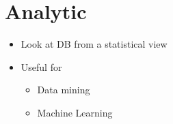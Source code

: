 
\section{Analytic}
\begin{itemize}
     
    \item Look at DB from a statistical view
    \item Useful for
        \begin{itemize}
            \item Data mining
            \item Machine Learning
        \end{itemize}
\end{itemize}

